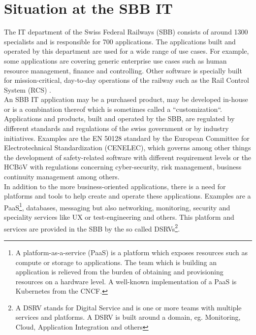 \documentclass[a4paper,12pt]{article}
\begin{document}
    \section{Situation at the SBB IT}
    \label{sec:sbbit}
    The IT department of the Swiss Federal Railways (SBB) consists of around 1300 specialists and is responsible for
    700 applications\parencite{sbbitkennzahlen}.
    The applications built and operated by this department are used for a wide range of use cases.
    For example, some applications are covering generic enterprise use cases such as human resource management, finance
    and controlling.
    Other software is specially built for mission-critical, day-to-day operations of the railway such as the Rail Control
    System (RCS)\parencite{sbbrcs} .\\
    An SBB IT application may be a purchased product, may be developed in-house or is a combination thereof which is
    sometimes called a ``customization``.\\
    Applications and products, built and operated by the SBB, are regulated by different standards and regulations of the
    swiss government or by industry initiatives.
    Examples are the EN 50128 standard by the European Committee for Electrotechnical Standardization (CENELEC)\parencite{cenelec},
    which governs among other things the development of safety-related software with different requirement levels
    or the HCBöV\parencite{hcboev} with regulations concerning cyber-security, risk management, business continuity
    management among others.\\
    In addition to the more business-oriented applications, there is a need for platforms and tools to help create
    and operate these applications.
    Examples are a PaaS\footnote{A platform-as-a-service (PaaS) is a platform which exposes resources such as compute or
    storage to applications. The team which is building an application is relieved from the burden of obtaining and
    provisioning resources on a hardware level. A well-known implementation of a PaaS is Kubernetes from the CNCF.},
    databases, messaging but also networking, monitoring, security and
    speciality services like UX or test-engineering and others.
    This platform and services are provided in the SBB by the so called DSRVs\footnote{
        A DSRV stands for Digital Service and is one or more teams with multiple services and platforms. A DSRV is built
        around a domain, eg. Monitoring, Cloud, Application Integration and others}.
\end{document}
